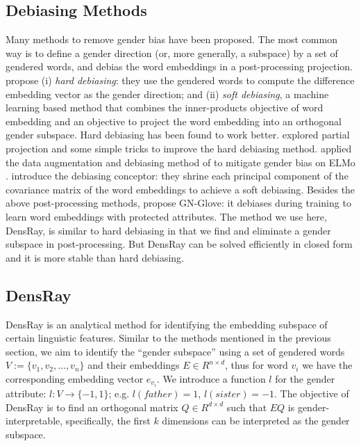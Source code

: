 

\subsection{Debiasing Methods}
 Many methods to remove gender bias have been proposed. The
 most common way is to define a gender direction (or, more
 generally, a subspace) by a set of gendered words, and
 debias the word embeddings in a post-processing
 projection. \citet{bolukbasi2016man} propose (i) \emph{hard
   debiasing}: they use the gendered words to compute the
 difference embedding vector as the gender direction; and
 (ii) \emph{soft debiasing},
 a
 machine learning based method
that combines
 the inner-products objective of word embedding and an
 objective to project the word embedding into an orthogonal
 gender subspace. Hard debiasing has been found to work
 better. 
 \citet{dev2019attenuating} explored partial projection and
 some simple tricks to improve the hard debiasing
 method. \citet{zhao2019gender} applied the data
 augmentation and debiasing method of
 \citet{bolukbasi2016man} to mitigate gender bias on ELMo
 \citep{Peters:2018}. \citet{karve2019conceptor} introduce
 the debiasing conceptor: they shrine each
 principal component of the covariance matrix of the word
 embeddings to achieve a soft debiasing. Besides the above
 post-processing methods, \citep{zhao2018learning} propose
 GN-Glove: it debiases during training to learn word
 embeddings with protected attributes. The method we use
 here, DensRay, is similar to
hard debiasing in that we find
and eliminate a gender subspace in post-processing.
But DensRay can be solved efficiently in closed form and it
is more stable than hard debiasing.

 
\subsection{DensRay}
DensRay is an analytical method for identifying the
embedding subspace of certain linguistic features. Similar to the
methods mentioned in the previous section, we aim to
identify the ``gender subspace'' using a set of gendered words
$V:=\{v_1,v_2,\dots,v_n\}$ and their embeddings $E \in
R^{n\times d}$, thus for word $v_i$ we have the
corresponding embedding vector $e_{v_i}$. We
introduce a function $l$ for the gender attribute:
$l:V\to \{-1,1\}$;
e.g. $l(father)=1$, $l(sister)=-1$. The objective of DensRay
is to find an orthogonal matrix $Q\in R^{d\times d}$ such
that $EQ$ is gender-interpretable, specifically, the first
$k$ dimensions can be interpreted as the gender subspace.

